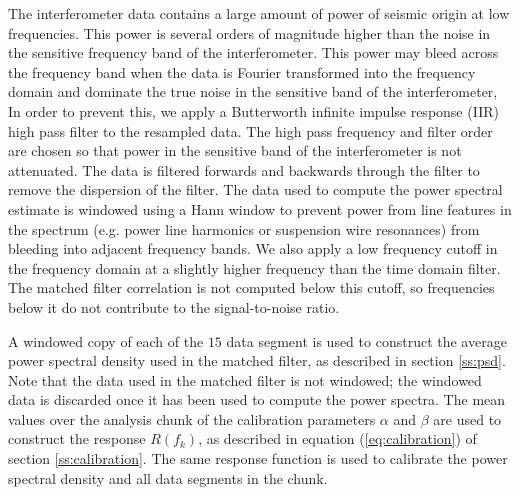 The interferometer data contains a large amount of power of seismic origin at
low frequencies.  This power is several orders of magnitude higher than the
noise in the sensitive frequency band of the interferometer. This power may
bleed across the frequency band when the data is Fourier transformed into the
frequency domain and dominate the true noise in the sensitive band of the
interferometer, In order to prevent this, we apply a Butterworth infinite
impulse response (IIR) high pass filter to the resampled data. The high pass
frequency and filter order are chosen so that power in the sensitive band of
the interferometer is not attenuated. The data is filtered forwards and
backwards through the filter to remove the dispersion of the filter.  The data
used to compute the power spectral estimate is windowed using a Hann window to
prevent power from line features in the spectrum (e.g. power line harmonics or
suspension wire resonances) from bleeding into adjacent frequency bands.
We also apply a low frequency cutoff in the frequency domain at a slightly
higher frequency than the time domain filter. The matched filter correlation
is not computed below this cutoff, so frequencies below it do not contribute
to the signal-to-noise ratio. 

A windowed copy of each of the $15$ data segment is used to construct the
average power spectral density used in the matched filter, as described in
section \ref{ss:psd}. Note that the data used in the matched filter is not
windowed; the windowed data is discarded once it has been used to compute the
power spectra.  The mean values over the analysis chunk of the calibration
parameters $\alpha$ and $\beta$ are used to construct the response $R(f_k)$,
as described in equation (\ref{eq:calibration}) of section \ref{ss:calibration}.
The same response function is used to calibrate the power spectral density and
all data segments in the chunk. 

